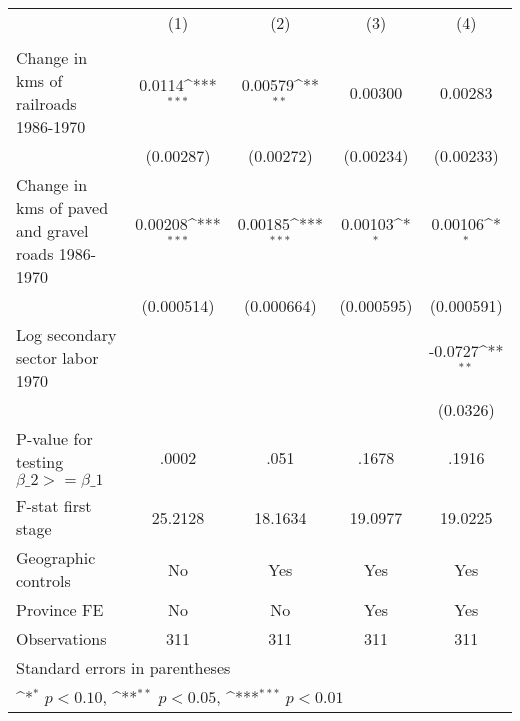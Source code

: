 {
\def\sym#1{\ifmmode^{#1}\else\(^{#1}\)\fi}
\begin{tabular}{l*{4}{c}}
\hline\hline
                &\multicolumn{1}{c}{(1)}&\multicolumn{1}{c}{(2)}&\multicolumn{1}{c}{(3)}&\multicolumn{1}{c}{(4)}\\
                &\multicolumn{1}{c}{}&\multicolumn{1}{c}{}&\multicolumn{1}{c}{}&\multicolumn{1}{c}{}\\
\hline
Change in kms of railroads 1986-1970&   0.0114\sym{***}&  0.00579\sym{**} &  0.00300         &  0.00283         \\
                &(0.00287)         &(0.00272)         &(0.00234)         &(0.00233)         \\
[1em]
Change in kms of paved and gravel roads 1986-1970&  0.00208\sym{***}&  0.00185\sym{***}&  0.00103\sym{*}  &  0.00106\sym{*}  \\
                &(0.000514)         &(0.000664)         &(0.000595)         &(0.000591)         \\
[1em]
Log secondary sector labor 1970&                  &                  &                  &  -0.0727\sym{**} \\
                &                  &                  &                  & (0.0326)         \\
\hline
P-value for testing $\beta\_{2} >= \beta\_{1}$&    .0002         &     .051         &    .1678         &    .1916         \\
F-stat first stage&  25.2128         &  18.1634         &  19.0977         &  19.0225         \\
Geographic controls&       No         &      Yes         &      Yes         &      Yes         \\
Province FE     &       No         &       No         &      Yes         &      Yes         \\
Observations    &      311         &      311         &      311         &      311         \\
\hline\hline
\multicolumn{5}{l}{\footnotesize Standard errors in parentheses}\\
\multicolumn{5}{l}{\footnotesize \sym{*} \(p<0.10\), \sym{**} \(p<0.05\), \sym{***} \(p<0.01\)}\\
\end{tabular}
}
